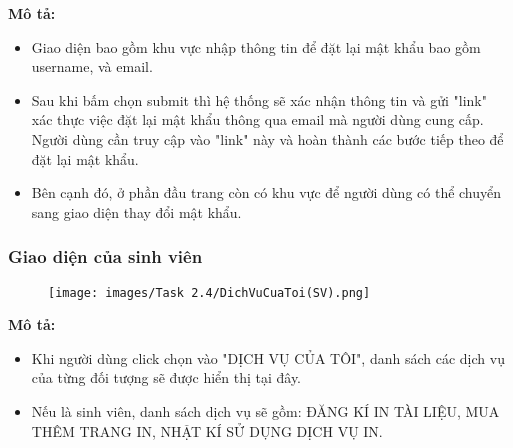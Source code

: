     \textbf{Mô tả:}
    \begin{itemize}
        \item Giao diện bao gồm khu vực nhập thông tin để đặt lại mật khẩu bao gồm username, và email.
        \item Sau khi bấm chọn submit thì hệ thống sẽ xác nhận thông tin và gửi "link" xác thực việc đặt lại mật khẩu thông qua email mà người dùng cung cấp. Người dùng cần truy cập vào "link" này và hoàn thành các bước tiếp theo để đặt lại mật khẩu.
        \item Bên cạnh đó, ở phần đầu trang còn có khu vực để người dùng có thể chuyển sang giao diện thay đổi mật khẩu.
    \end{itemize}
    \newpage
    \subsubsection{Giao diện của sinh viên}
    \begin{center}
    \begin{figure}[!htp]
    \begin{center}
     \texttt{[image: images/Task 2.4/DichVuCuaToi(SV).png]}
    \end{center}
    \label{refhinh1}
    \end{figure}
    \end{center}

    \textbf{Mô tả:}
    \begin{itemize}
    \item Khi người dùng click chọn vào "DỊCH VỤ CỦA TÔI", danh sách các dịch vụ của từng đối tượng sẽ được hiển thị tại đây.
    \item Nếu là sinh viên, danh sách dịch vụ sẽ gồm: ĐĂNG KÍ IN TÀI LIỆU, MUA THÊM TRANG IN, NHẬT KÍ SỬ DỤNG DỊCH VỤ IN.
    \end{itemize}
    
